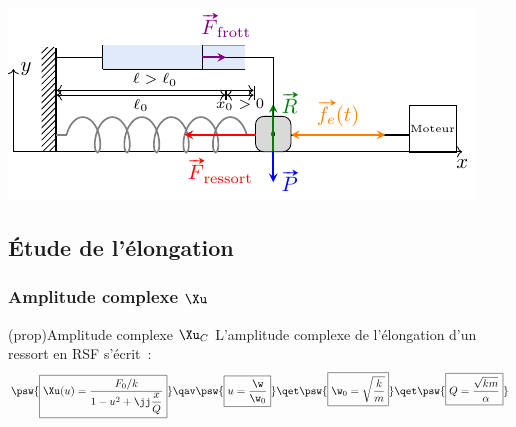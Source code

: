 \documentclass[../../main/main.tex]{subfiles}
\begin{document}
\begin{tcb*}
\begin{isd}[righthand ratio=.45]
\begin{center}
{			}{
				\includegraphics[width=\linewidth]{ressort-horiz}
			}
			\vspace{-15pt}
		\end{center}
	\end{isd}
\end{tcb*}

\subsection{Étude de l'élongation}
\subsubsection{Amplitude complexe $\Xu$}

\begin{tcb}(prop){Amplitude complexe $\Xu_C$}
	L'amplitude complexe de l'élongation d'un ressort en RSF s'écrit~:
	\[
		\psw{%
			\boxed{
				\Xu(u) =
				\frac{F_0/k}{1 - u ^2 + \jj\dfrac{x}{Q}}
			}
		}%
		\qav
		\psw{\boxed{u = \frac{\w}{\w_0}}}
		\qet
		\psw{\boxed{\w_0 = \sqrt{\frac{k}{m}}}}
		\qet
		\psw{\boxed{Q = \frac{\sqrt{km}}{\alpha}}}
	\]
\end{tcb}
\end{document}
